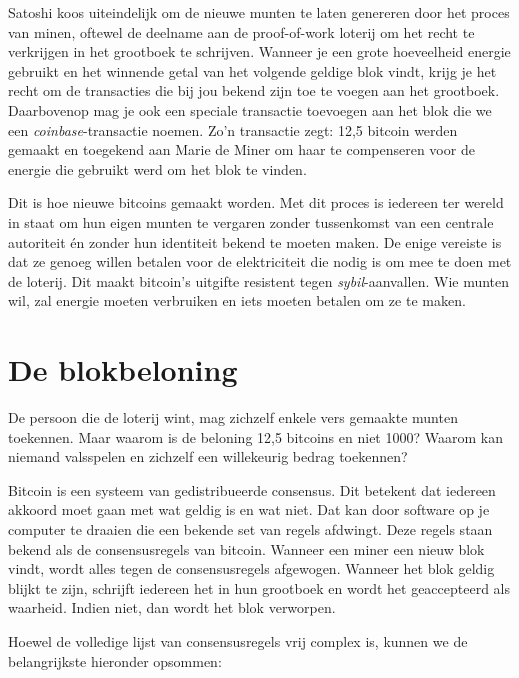 Satoshi koos uiteindelijk om de nieuwe munten te laten genereren door het proces van minen, oftewel de deelname aan de proof-of-work loterij om het recht te verkrijgen in het grootboek te schrijven. Wanneer je een grote hoeveelheid energie gebruikt en het winnende getal van het volgende geldige blok vindt, krijg je het recht om de transacties die bij jou bekend zijn toe te voegen aan het grootboek. Daarbovenop mag je ook een speciale transactie toevoegen aan het blok die we een \textit{coinbase}-transactie noemen. Zo’n transactie zegt: \textquotedbl{}12,5 bitcoin werden gemaakt en toegekend aan Marie de Miner om haar te compenseren voor de energie die gebruikt werd om het blok te vinden.\textquotedbl{}

Dit is hoe nieuwe bitcoins \textquotedbl{}gemaakt\textquotedbl{} worden. Met dit proces is iedereen ter wereld in staat om hun eigen munten te vergaren zonder tussenkomst van een centrale autoriteit én zonder hun identiteit bekend te moeten maken. De enige vereiste is dat ze genoeg willen betalen voor de elektriciteit die nodig is om mee te doen met de loterij. Dit maakt bitcoin’s uitgifte resistent tegen \textit{sybil}-aanvallen. Wie munten wil, zal energie moeten verbruiken en iets moeten betalen om ze te maken.

\section{De blokbeloning}
De persoon die de loterij wint, mag zichzelf enkele vers gemaakte munten toekennen. Maar waarom is de beloning 12,5 bitcoins en niet 1000? Waarom kan niemand valsspelen en zichzelf een willekeurig bedrag toekennen?

Bitcoin is een systeem van gedistribueerde consensus. Dit betekent dat iedereen akkoord moet gaan met wat geldig is en wat niet. Dat kan door software op je computer te draaien die een bekende set van regels afdwingt. Deze regels staan bekend als de consensusregels van bitcoin. Wanneer een miner een nieuw blok vindt, wordt alles tegen de consensusregels afgewogen. Wanneer het blok geldig blijkt te zijn, schrijft iedereen het in hun grootboek en wordt het geaccepteerd als waarheid. Indien niet, dan wordt het blok verworpen.

Hoewel de volledige lijst van consensusregels vrij complex is, kunnen we de belangrijkste hieronder opsommen:

